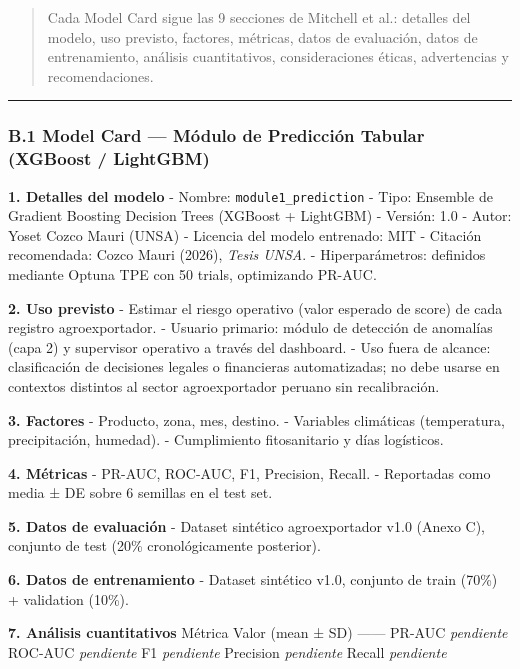 \begin{quote}
Cada Model Card sigue las 9 secciones de Mitchell et al.: detalles del
modelo, uso previsto, factores, métricas, datos de evaluación, datos de
entrenamiento, análisis cuantitativos, consideraciones éticas,
advertencias y recomendaciones.
\end{quote}

\begin{center}\rule{0.5\linewidth}{0.5pt}\end{center}

\subsubsection{B.1 Model Card --- Módulo de Predicción Tabular (XGBoost
/
LightGBM)}\label{b.1-model-card-muxf3dulo-de-predicciuxf3n-tabular-xgboost-lightgbm}

\textbf{1. Detalles del modelo} - Nombre: \texttt{module1\_prediction} -
Tipo: Ensemble de Gradient Boosting Decision Trees (XGBoost + LightGBM)
- Versión: 1.0 - Autor: Yoset Cozco Mauri (UNSA) - Licencia del modelo
entrenado: MIT - Citación recomendada: Cozco Mauri (2026), \emph{Tesis
UNSA}. - Hiperparámetros: definidos mediante Optuna TPE con 50 trials,
optimizando PR-AUC.

\textbf{2. Uso previsto} - Estimar el riesgo operativo (valor esperado
de score) de cada registro agroexportador. - Usuario primario: módulo de
detección de anomalías (capa 2) y supervisor operativo a través del
dashboard. - Uso fuera de alcance: clasificación de decisiones legales o
financieras automatizadas; no debe usarse en contextos distintos al
sector agroexportador peruano sin recalibración.

\textbf{3. Factores} - Producto, zona, mes, destino. - Variables
climáticas (temperatura, precipitación, humedad). - Cumplimiento
fitosanitario y días logísticos.

\textbf{4. Métricas} - PR-AUC, ROC-AUC, F1, Precision, Recall. -
Reportadas como media ± DE sobre 6 semillas en el test set.

\textbf{5. Datos de evaluación} - Dataset sintético agroexportador v1.0
(Anexo C), conjunto de test (20\% cronológicamente posterior).

\textbf{6. Datos de entrenamiento} - Dataset sintético v1.0, conjunto de
train (70\%) + validation (10\%).

\textbf{7. Análisis cuantitativos} \textbar{} Métrica \textbar{} Valor
(mean ± SD) \textbar{} \textbar---\textbar---\textbar{} \textbar{}
PR-AUC \textbar{} \emph{pendiente} \textbar{} \textbar{} ROC-AUC
\textbar{} \emph{pendiente} \textbar{} \textbar{} F1 \textbar{}
\emph{pendiente} \textbar{} \textbar{} Precision \textbar{}
\emph{pendiente} \textbar{} \textbar{} Recall \textbar{}
\emph{pendiente} \textbar{}

